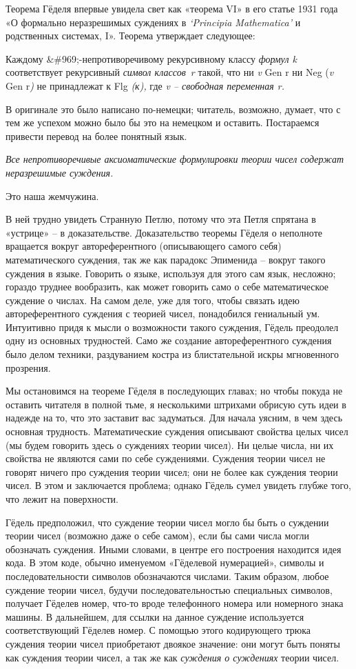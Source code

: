 \documentclass[../main.tex]{subfiles}
\begin{document}
Теорема Гёделя впервые увидела свет как «теорема VI» в его статье 1931 года «О формально неразрешимых суждениях в \emph{\enquote*{Principia Mathematica}} и родственных системах, I». Теорема утверждает следующее:

Каждому \&\#969;-непротиворечивому рекурсивному классу \emph{формул k} соответствует рекурсивный \emph{символ классов~r} такой, что ни \emph{v} Gen r ни Neg (\emph{v} Gen r\emph{)} не принадлежат к Flg \emph{(к),} где \emph{v \--- свободная переменная r.}

В оригинале это было написано по-немецки; читатель, возможно, думает, что с тем же успехом можно было бы это на немецком и оставить. Постараемся привести перевод на более понятный язык.

\emph{Все непротиворечивые аксиоматические формулировки теории чисел содержат неразрешимые суждения.}

Это наша жемчужина.

В ней трудно увидеть Странную Петлю, потому что эта Петля спрятана в «устрице» \--- в доказательстве. Доказательство теоремы Гёделя о неполноте вращается вокруг автореферентного (описывающего самого себя) математического суждения, так же как парадокс Эпименида \--- вокруг такого суждения в языке. Говорить о языке, используя для этого сам язык, несложно; гораздо труднее вообразить, как может говорить само о себе математическое суждение о числах. На самом деле, уже для того, чтобы связать идею автореферентного суждения с теорией чисел, понадобился гениальный ум. Интуитивно придя к мысли о возможности такого суждения, Гёдель преодолел одну из основных трудностей. Само же создание автореферентного суждения было делом техники, раздуванием костра из блистательной искры мгновенного прозрения.

Мы остановимся на теореме Гёделя в последующих главах; но чтобы покуда не оставить читателя в полной тьме, я несколькими штрихами обрисую суть идеи в надежде на то, что это заставит вас задуматься. Для начала уясним, в чем здесь основная трудность. Математические суждения описывают свойства целых чисел (мы будем говорить здесь о суждениях теории чисел). Ни целые числа, ни их свойства не являются сами по себе суждениями. Суждения теории чисел не говорят ничего про суждения теории чисел; они не более как суждения теории чисел. В этом и заключается проблема; однако Гёдель сумел увидеть глубже того, что лежит на поверхности.

Гёдель предположил, что суждение теории чисел могло бы быть о суждении теории чисел (возможно даже о себе самом), если бы сами числа могли обозначать суждения. Иными словами, в центре его построения находится идея кода. В этом коде, обычно именуемом «Гёделевой нумерацией», символы и последовательности символов обозначаются числами. Таким образом, любое суждение теории чисел, будучи последовательностью специальных символов, получает Гёделев номер, что-то вроде телефонного номера или номерного знака машины. В дальнейшем, для ссылки на данное суждение используется соответствующий Гёделев номер. С помощью этого кодирующего трюка суждения теории чисел приобретают двоякое значение: они могут быть поняты как суждения теории чисел, а так же как \emph{суждения о суждениях} теории чисел.
\end{document}
